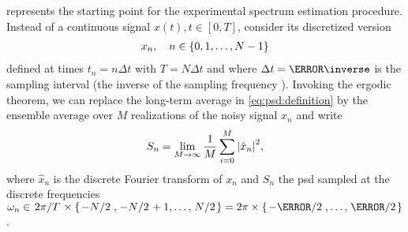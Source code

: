  represents the starting point for the experimental spectrum estimation procedure.
Instead of a continuous signal $x(t), t\in [0, T]$, consider its discretized version
\begin{align}\label{eq:signal:discrete}
    x_n \qc n\in\lbrace 0, 1, \dotsc, N - 1\rbrace
\end{align}
defined at times $t_n = n\Delta t$ with $T = N\Delta t$ and where $\Delta t = \fs\inverse$ is the sampling interval (the inverse of the sampling frequency \fs).
Invoking the ergodic theorem, we can replace the long-term average in \cref{eq:psd:definition} by the ensemble average over $M$ realizations of the noisy signal $x_n$ and write
\begin{align}\label{eq:psd:definition:discrete}
    S_n = \lim_{M\to\infty}\frac{1}{M} \sum_{i=0}^M \abs{\hat{x}_n}^2,
\end{align}
where $\hat{x}_n$ is the discrete Fourier transform of $x_n$ and $S_n$ the \gls{psd} sampled at the discrete frequencies $\omega_n\in \flatfrac{2\pi}{T}\times\lbrace\flatfrac{-N}{2}, \flatfrac{-N}{2} + 1, \dotsc, \flatfrac{N}{2}\rbrace = 2\pi\times\lbrace\flatfrac{-\fs}{2}, \dotsc, \flatfrac{\fs}{2}\rbrace$.

